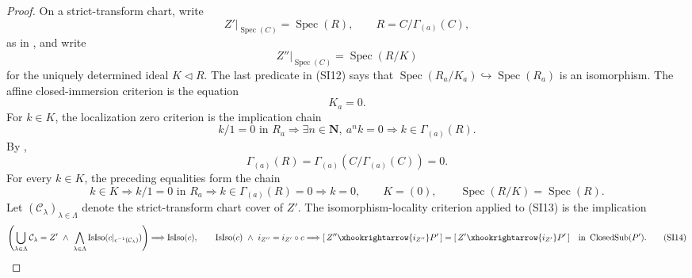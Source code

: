 \begin{proof}
  On a strict-transform chart, write
  \[
    Z'|_{\operatorname{Spec}(C)}
      =\operatorname{Spec}(R),\qquad
    R=C/\Gamma_{(a)}(C),
  \]
  as in , and write
  \[
    Z''|_{\operatorname{Spec}(C)}=\operatorname{Spec}(R/K)
  \]
  for the uniquely determined ideal $K\triangleleft R$.  The last predicate
  in (SI12) says that
  $\operatorname{Spec}(R_a/K_a)\hookrightarrow\operatorname{Spec}(R_a)$ is
  an isomorphism.  The affine closed-immersion criterion is the equation
  \[
    K_a=0.
  \]
  For $k\in K$, the localization zero criterion is the implication chain
  \[
    k/1=0\text{ in }R_a
      \Longrightarrow \exists n\in\mathbf N,\ a^nk=0
      \Longrightarrow k\in\Gamma_{(a)}(R).
  \]
  By ,
  \[
    \Gamma_{(a)}(R)
      =\Gamma_{(a)}(C/\Gamma_{(a)}(C))=0.
  \]
  For every $k\in K$, the preceding equalities form the chain
  \[
    k\in K
      \Longrightarrow k/1=0\text{ in }R_a
      \Longrightarrow k\in\Gamma_{(a)}(R)=0
      \Longrightarrow k=0,
    \qquad
    K=(0),
    \qquad
    \operatorname{Spec}(R/K)=\operatorname{Spec}(R).              \tag{SI13}
  \]
  Let $(\mathcal C_\lambda)_{\lambda\in\Lambda}$ denote the
  strict-transform chart cover of $Z'$.  The isomorphism-locality criterion
  applied to \textup{(SI13)} is the implication
  \[
    \left(\bigcup_{\lambda\in\Lambda}\mathcal C_\lambda=Z'
      \ \wedge\
      \bigwedge_{\lambda\in\Lambda}
        \operatorname{IsIso}(c|_{c^{-1}(\mathcal C_\lambda)})\right)
      \Longrightarrow\operatorname{IsIso}(c),
    \qquad
    \operatorname{IsIso}(c)\ \wedge\ i_{Z''}=i_{Z'}\circ c
      \Longrightarrow
      [\,Z''\xhookrightarrow{i_{Z''}}P'\,]
        =[\,Z'\xhookrightarrow{i_{Z'}}P'\,]
        \quad\text{in }\operatorname{ClosedSub}(P').             \tag{SI14}
  \]
\end{proof}

